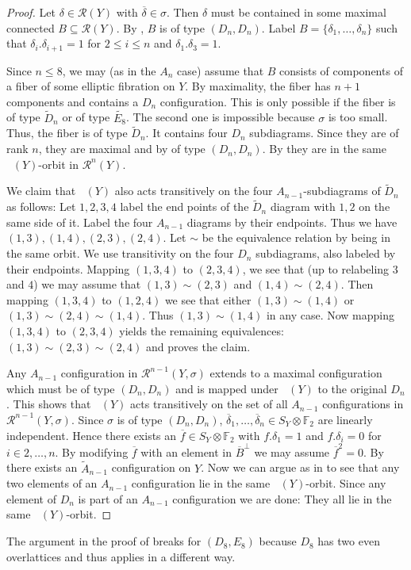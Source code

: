 \documentclass[a4paper]{amsart}
\theoremstyle{definition}
\theoremstyle{plain}
\DeclareMathOperator{\aut}{Aut^*}
\newcommand{\FF}{\mathbb{F}}
\newcommand{\R}{\mathcal{R}}
\begin{document}
\begin{proof}
Let $\delta \in \R(Y)$ with $\overline{\delta} \in \sigma$. Then $\delta$ must be contained in some maximal connected $B \subseteq \R(Y)$. By , $B$ is of type $(D_n,D_n)$.
Label $B = \{\delta_1,\dots, \delta_n\}$ such that $\delta_i.\delta_{i+1}=1$ for $2\leq i \leq n$ and $\delta_1.\delta_3=1$.

Since $n\leq 8$, we may (as in the $A_n$ case) assume that $B$ consists of components of a fiber of some elliptic fibration on $Y$. By maximality, the fiber has $n+1$ components and contains a $D_n$ configuration. This is only possible if the fiber is of type
$\widetilde{D}_n$ or of type $\widetilde{E_8}$. The second one is impossible because $\sigma$ is too small.
Thus, the fiber is of type $\widetilde{D}_n$. It contains four $D_n$ subdiagrams. Since they are of rank $n$, they are maximal and by  of type $(D_n,D_n)$.
By  they are in the same $\aut(Y)$-orbit in $\R^n(Y)$.

We claim that $\aut(Y)$ also acts transitively on the four $A_{n-1}$-subdiagrams of $\widetilde{D}_n$ as follows: Let $1,2,3,4$ label the end points of the $\widetilde{D}_n$ diagram with $1,2$ on the same side of it. Label the four $A_{n-1}$ diagrams by their endpoints. 
Thus we have $(1,3),(1,4),(2,3),(2,4)$. Let $\sim$ be the equivalence relation by being in the same orbit. We use transitivity on the four $D_n$ subdiagrams, also labeled by their endpoints.
Mapping $(1,3,4)$ to $(2,3,4)$, we see that (up to relabeling $3$ and $4$) we may assume that $(1,3) \sim (2,3)$ and $(1,4)\sim (2,4)$. 
Then mapping $(1,3,4)$ to $(1,2,4)$ we see that either $(1,3) \sim (1,4)$ or $(1,3)\sim (2,4) \sim (1,4)$. Thus $(1,3)\sim (1,4)$ in any case. Now mapping $(1,3,4)$ to $(2,3,4)$ yields the remaining equivalences: $(1,3) \sim (2,3)\sim (2,4)$ and proves the claim.

Any $A_{n-1}$ configuration in $\R^{n-1}(Y,\sigma)$ extends to a maximal configuration which must be of type $(D_n,D_n)$ and is mapped under $\aut(Y)$ to the original $D_{n}$. This shows that $\aut(Y)$ acts transitively on the set of all $A_{n-1}$ configurations in $\R^{n-1}(Y,\sigma)$.
Since $\sigma$ is of type $(D_n,D_n)$, $\overline{\delta}_1,\dots, \overline{\delta}_n \in S_Y\otimes \FF_2$ are linearly independent. Hence there exists an $\overline{f} \in S_Y\otimes \FF_2$ with $f.\delta_1=1$ and $f.\delta_i=0$ for $i \in 2,\dots, n$. By modifying $\overline{f}$ with an element in $\overline{B}^\perp$ we may assume $\overline{f}^2=0$.
By \cite{brandhorst-gonzalez:527} there exists an $\widetilde{A}_{n-1}$ configuration on $Y$. Now we can argue as in  to see that any two elements of an $A_{n-1}$ configuration lie in the same $\aut(Y)$-orbit.
Since any element of $D_n$ is part of an $A_{n-1}$ configuration we are done:
They all lie in the same $\aut(Y)$-orbit.
\end{proof}
The argument in the proof of  breaks for $(D_8,E_8)$ because 
$D_8$ has two even overlattices and thus  applies in a different way.
\end{document}
